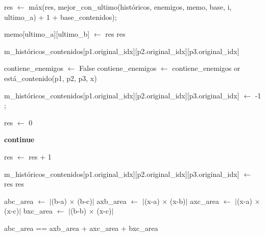 \begin{algorithmic}
			 
				res $\gets$ máx(res, mejor_con_ultimo(históricos, enemigos, memo, base, i, ultimo_a) + 1 + base_contenidos);

			\EndIf

		\EndFor
	\EndIf

	\State memo[ultimo_a][ultimo_b] $\gets$ res
	\State \Return res

\EndFunction

\vspace{2em}

	\State {}
		\State \Return m_históricos_contenidos[p1.original_idx][p2.original_idx][p3.original_idx]
	\EndIf

	\State contiene_enemigos $\gets$ False
		\State contiene_enemigos $\gets$ contiene_enemigos or está_contenido(p1, p2, p3, x)
	\EndFor

		\State m_históricos_contenidos[p1.original_idx][p2.original_idx][p3.original_idx] $\gets$ -1
        \State {};
	\EndIf

	\State res $\gets$ 0

             \State \textbf{continue}
        \EndIf

        	\State res $\gets$ res + 1
        \EndIf
	\EndFor

	\State m_históricos_contenidos[p1.original_idx][p2.original_idx][p3.original_idx] $\gets$ res
	\State \Return res

\EndFunction

\vspace{2em}

	\State abc_area $\gets$ $|$(b-a) $\times$ (b-c)$|$
	\State axb_area $\gets$ $|$(x-a) $\times$ (x-b)$|$
	\State axc_area $\gets$ $|$(x-a) $\times$ (x-c)$|$
	\State bxc_area $\gets$ $|$(b-b) $\times$ (x-c)$|$

	\State \Return abc_area == axb_area + axc_area + bxc_area
\EndFunction

\end{algorithmic}



